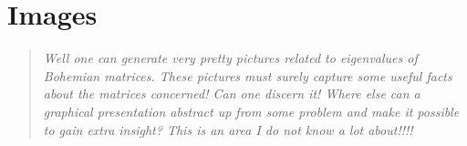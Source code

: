 \section{Images}

\begin{quotation}\textit{
Well one can generate very pretty pictures related to eigenvalues of
Bohemian matrices. These pictures must surely capture some useful
facts about the matrices concerned! Can one discern it!
Where else can a graphical presentation abstract up from some
problem and make it possible to gain extra insight?
This is an area I do not know a lot about!!!!
}\end{quotation}
